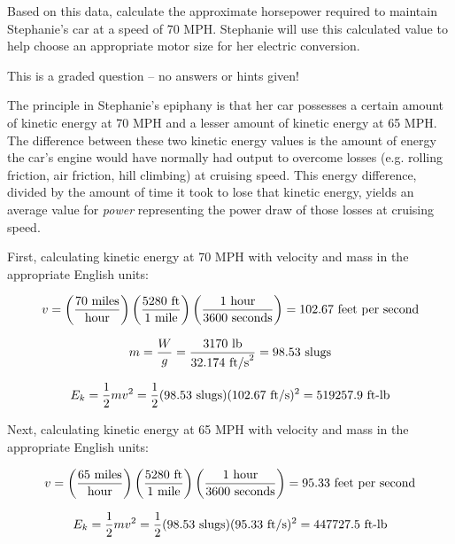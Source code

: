 Based on this data, calculate the approximate horsepower required to maintain Stephanie's car at a speed of 70 MPH.  Stephanie will use this calculated value to help choose an appropriate motor size for her electric conversion.

\vfil

\eject






This is a graded question -- no answers or hints given!







The principle in Stephanie's epiphany is that her car possesses a certain amount of kinetic energy at 70 MPH and a lesser amount of kinetic energy at 65 MPH.  The difference between these two kinetic energy values is the amount of energy the car's engine would have normally had output to overcome losses (e.g. rolling friction, air friction, hill climbing) at cruising speed.  This energy difference, divided by the amount of time it took to lose that kinetic energy, yields an average value for {\it power} representing the power draw of those losses at cruising speed.

\vskip 10pt

First, calculating kinetic energy at 70 MPH with velocity and mass in the appropriate English units:

$$v = \left(70 \hbox{ miles} \over \hbox{hour} \right) \left(5280 \hbox{ ft} \over 1 \hbox{ mile}\right) \left(1 \hbox{ hour} \over 3600 \hbox{ seconds}\right) = 102.67 \hbox{ feet per second}$$

$$m = {W \over g} = {3170 \hbox{ lb} \over 32.174 \hbox{ ft/s}^2} = 98.53 \hbox{ slugs}$$

$$E_k = {1 \over 2} mv^2 = {1 \over 2} (98.53 \hbox{ slugs}) (102.67 \hbox{ ft/s})^2 = 519257.9 \hbox{ ft-lb}$$

\vskip 10pt

Next, calculating kinetic energy at 65 MPH with velocity and mass in the appropriate English units:

$$v = \left(65 \hbox{ miles} \over \hbox{hour} \right) \left(5280 \hbox{ ft} \over 1 \hbox{ mile}\right) \left(1 \hbox{ hour} \over 3600 \hbox{ seconds}\right) = 95.33 \hbox{ feet per second}$$

$$E_k = {1 \over 2} mv^2 = {1 \over 2} (98.53 \hbox{ slugs}) (95.33 \hbox{ ft/s})^2 = 447727.5 \hbox{ ft-lb}$$

